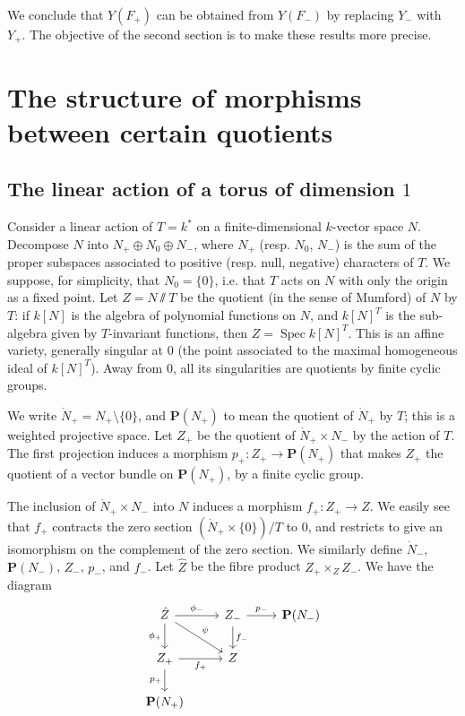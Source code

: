 \documentclass{article}
\newcommand{\PP}{\mathbf{P}}
\DeclareMathOperator{\Spec}{Spec}
\newcommand{\oldpage}[1]{\marginpar{\footnotesize$\Big\vert$ \textit{p.~#1}}}
\begin{document}
We conclude that $Y(F_+)$ can be obtained from $Y(F_-)$ by replacing $Y_-$ with $Y_+$.
The objective of the second section is to make these results more precise.


\section{The structure of morphisms between certain quotients}
\label{2}

\subsection{The linear action of a torus of dimension \texorpdfstring{$1$}{1}}
\label{2.1}

Consider a linear action of $T=k^*$ on a finite-dimensional $k$-vector space $N$.
Decompose $N$ into $N_+\oplus N_0\oplus N_-$, where $N_+$ (resp. $N_0$, $N_-$) is the sum of the proper subspaces associated to positive (resp. null, negative) characters of $T$.
We suppose, for simplicity, that $N_0=\{0\}$, i.e. that $T$ acts on $N$ with only the origin as a fixed point.
Let $Z=N \sslash T$ be the quotient (in the sense of Mumford) of $N$ by $T$: if $k[N]$ is the algebra of polynomial functions on $N$, and $k[N]^T$ is the sub-algebra given by $T$-invariant functions, then $Z=\Spec k[N]^T$.
This is an affine variety, generally singular at $0$ (the point associated to the maximal homogeneous ideal of $k[N]^T$).
Away from $0$, all its singularities are quotients by finite cyclic groups.

\oldpage{518}
We write $\dot{N}_+=N_+\setminus\{0\}$, and $\PP(N_+)$ to mean the quotient of $\dot{N}_+$ by $T$;
this is a weighted projective space.
Let $Z_+$ be the quotient of $\dot{N}_+\times N_-$ by the action of $T$.
The first projection induces a morphism $p_+\colon Z_+\to\PP(N_+)$ that makes $Z_+$ the quotient of a vector bundle on $\PP(N_+)$, by a finite cyclic group.

The inclusion of $\dot{N}_+\times N_-$ into $N$ induces a morphism $f_+\colon Z_+\to Z$.
We easily see that $f_+$ contracts the zero section $(\dot{N}_+\times\{0\})/T$ to $0$, and restricts to give an isomorphism on the complement of the zero section.
We similarly define $\dot{N}_-$, $\PP(N_-)$, $Z_-$, $p_-$, and $f_-$.
Let $\hat{Z}$ be the fibre product $Z_+\times_Z Z_-$.
We have the diagram
\[
  \begin{tikzcd}
    \hat{Z} \rar["\phi_-"] \dar[swap,"\phi_+"] \drar["\psi"]
    & Z_- \dar["f_-"] \rar["p_-"]
    & \PP(N_-)
  \\Z_+ \rar[swap,"f_+"] \dar[swap,"p_+"]
    & Z
  \\\PP(N_+)
  \end{tikzcd}
\]
\end{document}
